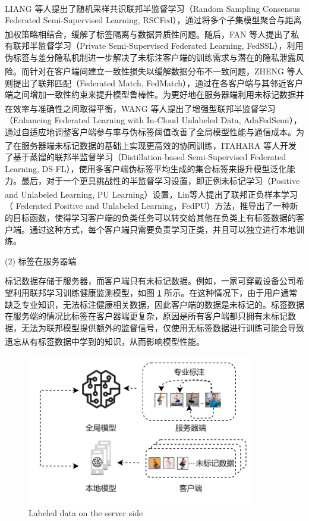 LIANG\textsuperscript{\cite{liang2022rscfed}} 等人提出了随机采样共识联邦半监督学习（Random Sampling Consensus Federated Semi-Supervised Learning, RSCFed），通过将多个子集模型聚合与距离加权策略相结合，缓解了标签隔离与数据异质性问题。随后，FAN\textsuperscript{\cite{fan2022private}} 等人提出了私有联邦半监督学习（Private Semi-Supervised Federated Learning, FedSSL），利用伪标签与差分隐私机制进一步解决了未标注客户端的训练需求与潜在的隐私泄露风险。而针对在客户端间建立一致性损失以缓解数据分布不一致问题，ZHENG\textsuperscript{\cite{jeong2020federated}} 等人则提出了联邦匹配（Federated Match, FedMatch），通过在各客户端与其邻近客户端之间增加一致性约束来提升模型鲁棒性。为更好地在服务器端利用未标记数据并在效率与准确性之间取得平衡，WANG\textsuperscript{\cite{wang2022enhancing}} 等人提出了增强型联邦半监督学习（Enhancing Federated Learning with In-Cloud Unlabeled Data, AdaFedSemi），通过自适应地调整客户端参与率与伪标签阈值改善了全局模型性能与通信成本。为了在服务器端未标记数据的基础上实现更高效的协同训练，ITAHARA\textsuperscript{\cite{itahara2021distillation}} 等人开发了基于蒸馏的联邦半监督学习（Distillation-based Semi-Supervised Federated Learning, DS-FL），使用多客户端伪标签平均生成的集合标签来提升模型泛化能力。最后，对于一个更具挑战性的半监督学习设置，即正例未标记学习（Positive and Unlabeled Learning, PU Learning）设置，Lin\textsuperscript{\cite{FedPU}}等人提出了联邦正负样本学习（ Federated Positive and Unlabeled Learning，FedPU）方法，推导出了一种新的目标函数，使得学习客户端的负类任务可以转交给其他在负类上有标签数据的客户端。通过这种方式，每个客户端只需要负责学习正类，并且可以独立进行本地训练。

(2) 标签在服务器端

标记数据存储于服务器，而客户端只有未标记数据。例如，一家可穿戴设备公司希望利用联邦学习训练健康监测模型，如图 \ref{LabelAtServer} 所示。在这种情况下，由于用户通常缺乏专业知识，无法标注健康相关数据，因此客户端的数据是未标记的。标签数据在服务端的情况比标签在客户器端更复杂，原因是所有客户端都只拥有未标记数据，无法为联邦模型提供额外的监督信号，仅使用无标签数据进行训练可能会导致遗忘从有标签数据中学到的知识，从而影响模型性能\textsuperscript{\cite{jeong2020federated,diao2022semifl}}。

\begin{figure}[H]
	\centering
	\includegraphics[width=10cm]{chapters/imgs/LabelAtServer}
	{\wuhao Labeled data on the server side}
	\label{LabelAtServer}
\end{figure}
\vspace{-0.35cm}


